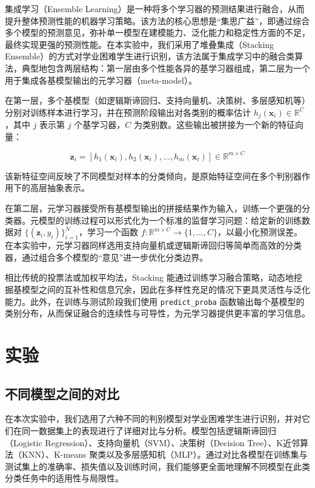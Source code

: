 \documentclass[a4paper, utf8]{ctexart}
\begin{document}
	集成学习（Ensemble Learning）是一种将多个学习器的预测结果进行融合，从而提升整体预测性能的机器学习策略\cite{ref6}。该方法的核心思想是“集思广益”，即通过综合多个模型的预测意见，弥补单一模型在建模能力、泛化能力和稳定性方面的不足，最终实现更强的预测性能。在本实验中，我们采用了堆叠集成（Stacking Ensemble）的方式对学业困难学生进行识别，该方法属于集成学习中的融合类算法，典型地包含两层结构：第一层由多个性能各异的基学习器组成，第二层为一个用于集成各基模型输出的元学习器（meta-model）\cite{ref25}。
	
	在第一层，多个基模型（如逻辑斯谛回归、支持向量机、决策树、多层感知机等）分别对训练样本进行学习，并在预测阶段输出对各类别的概率估计 $h_j(\mathbf{x}_i)\in\mathbb{R}^{C}$，其中 $j$ 表示第 $j$ 个基学习器，$C$ 为类别数。这些输出被拼接为一个新的特征向量：
	
	\vspace{-.5em}
	\begin{equation}
		\mathbf{z}_i=[h_1(\mathbf{x}_i), h_2(\mathbf{x}_i), ..., h_m(\mathbf{x}_i)]\in\mathbb{R}^{m \times C}
	\end{equation}
	
	该新特征空间反映了不同模型对样本的分类倾向，是原始特征空间在多个判别器作用下的高层抽象表示\cite{ref25,ref11}。
	
	在第二层，元学习器接受所有基模型输出的拼接结果作为输入，训练一个更强的分类器。元模型的训练过程可以形式化为一个标准的监督学习问题：给定新的训练数据对 $\{(\mathbf{z}_i,y_i)\}^N_{i=1}$，学习一个函数 $f:\mathbb{R}^{m \times C} \rightarrow \{1, ..., C\}$，以最小化预测误差。在本实验中，元学习器同样选用支持向量机或逻辑斯谛回归等简单而高效的分类器，通过组合多个模型的“意见”进一步优化分类边界\cite{ref10,ref26}。
	
	相比传统的投票法或加权平均法，Stacking 能通过训练学习融合策略，动态地挖掘基模型之间的互补性和信息冗余，因此在多样性充足的情况下更具灵活性与泛化能力\cite{ref25}。此外，在训练与测试阶段我们使用 \verb|predict_proba| 函数输出每个基模型的类别分布，从而保证融合的连续性与可导性，为元学习器提供更丰富的学习信息\cite{ref11}。
	
	\section{实验}
	
	\subsection{不同模型之间的对比}
	
	在本次实验中，我们选用了六种不同的判别模型对学业困难学生进行识别，并对它们在同一数据集上的表现进行了详细对比与分析。模型包括逻辑斯谛回归（Logistic Regression）、支持向量机（SVM）、决策树（Decision Tree）、K近邻算法（KNN）、K-means 聚类以及多层感知机（MLP）。通过对比各模型在训练集与测试集上的准确率、损失值以及训练时间，我们能够更全面地理解不同模型在此类分类任务中的适用性与局限性。
	
\end{document}
